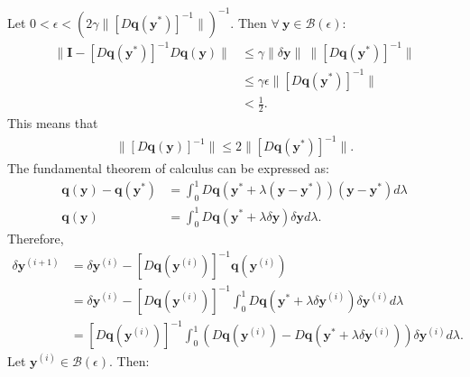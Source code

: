 Let $0 < \epsilon < \left(2\gamma \big \|[D\mathbf{q}(\mathbf{y}^*)]^{-1}\big \|\right)^{-1}$. Then $\forall \ \mathbf{y} \in \mathcal{B}(\epsilon)$: 
\begin{equation}
\begin{split}
    \big \|\mathbf{I} - [D\mathbf{q}(\mathbf{y}^*)]^{-1}D\mathbf{q}(\mathbf{y})\big \| & \le  \gamma \big \|\delta\mathbf{y}\big \| \ \big \|[D\mathbf{q}(\mathbf{y}^*)]^{-1}\big \| \\
    & \le  \gamma \epsilon \big \|[D\mathbf{q}(\mathbf{y}^*)]^{-1}\big \| \\
    & < \frac{1}{2}.
\end{split}
\end{equation}
This means that
\begin{align}
\label{eq:norm-relation}
    \big \| [D\mathbf{q}(\mathbf{y})]^{-1} \big \| \le 2\big \|[D\mathbf{q}(\mathbf{y}^*)]^{-1}\big \|.
\end{align}
The fundamental theorem of calculus can be expressed as:
\begin{equation}
\begin{split}
    \mathbf{q}(\mathbf{y})-\mathbf{q}(\mathbf{y}^*) & = \int_0^1 D\mathbf{q} \left(\mathbf{y}^*+\lambda\left(\mathbf{y}-
    \mathbf{y}^*\right)\right) \left(\mathbf{y}-\mathbf{y}^*\right) d\lambda \\
    \mathbf{q}(\mathbf{y}) & = \int_0^1 D\mathbf{q} \left(\mathbf{y}^*+\lambda\delta \mathbf{y}\right) \delta \mathbf{y} d\lambda .
\end{split}
\end{equation}
Therefore,
\begin{equation}
\begin{split}
    \delta \mathbf{y}^{(i+1)} & = \delta \mathbf{y}^{(i)} - [D\mathbf{q}(\mathbf{y}^{(i)})]^{-1} \mathbf{q}(\mathbf{y}^{(i)}) \\
    & = \delta \mathbf{y}^{(i)} - [D\mathbf{q}(\mathbf{y}^{(i)})]^{-1}\int_0^1 D\mathbf{q} \left(\mathbf{y}^*+\lambda\delta \mathbf{y}^{(i)}\right) \delta \mathbf{y}^{(i)} d\lambda \\
    & = [D\mathbf{q}(\mathbf{y}^{(i)})]^{-1}\int_0^1 \left(D\mathbf{q}(\mathbf{y}^{(i)})-D\mathbf{q} \left(\mathbf{y}^*+\lambda\delta \mathbf{y}^{(i)}\right)\right) \delta \mathbf{y}^{(i)} d\lambda.
\end{split}
\end{equation}
Let $\mathbf{y}^{(i)} \in \mathcal{B}(\epsilon)$. Then:
